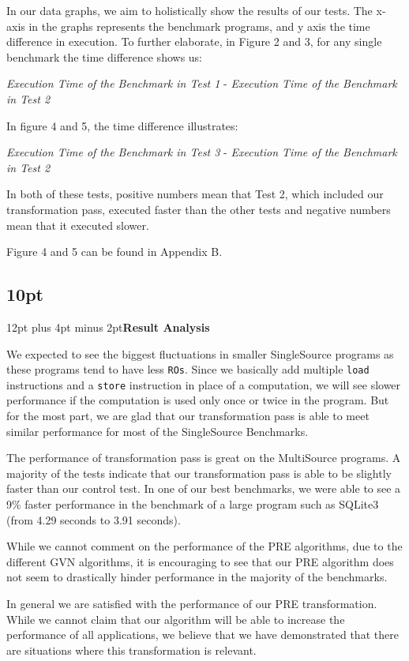 \documentclass[onecolumn,10pt]{journal}
\begin{document}
In our data graphs, we aim to holistically show the results of our tests. The x-axis in the graphs represents the benchmark programs, and y axis the time difference in execution. To further elaborate, in Figure 2 and 3, for any single benchmark the time difference shows us:
\begin{center}
\textit{Execution Time of the Benchmark in Test 1} - \textit{Execution Time of the Benchmark in Test 2}
\end{center}
In figure 4 and 5, the time difference illustrates:
\begin{center}
\textit{Execution Time of the Benchmark in Test 3} - \textit{Execution Time of the Benchmark in Test 2}
\end{center}
In both of these tests, positive numbers mean that Test 2, which included our transformation pass, executed faster than the other tests and negative numbers mean that it executed slower.

Figure 4 and 5 can be found in Appendix B.

\noindent\titlespacing\subsection*{10pt}{12pt plus 4pt minus 2pt}\textbf{Result Analysis}

We expected to see the biggest fluctuations in smaller SingleSource programs as these programs tend to have less \texttt{ROs}. Since we basically add multiple \texttt{load} instructions and a \texttt{store} instruction in place of a computation, we will see slower performance if the computation is used only once or twice in the program. But for the most part, we are glad that our transformation pass is able to meet similar performance for most of the SingleSource Benchmarks. 

The performance of transformation pass is great on the MultiSource programs. A majority of the tests indicate that our transformation pass is able to be slightly faster than our control test. In one of our best benchmarks, we were able to see a 9\% faster performance in the benchmark of a large program such as SQLite3 (from 4.29 seconds to 3.91 seconds).

While we cannot comment on the performance of the PRE algorithms, due to the different GVN algorithms, it is encouraging to see that our PRE algorithm does not seem to drastically hinder performance in the majority of the benchmarks.

In general we are satisfied with the performance of our PRE transformation. While we cannot claim that our algorithm will be able to increase the performance of all applications, we believe that we have demonstrated that there are situations where this transformation is relevant. 
\end{document}
